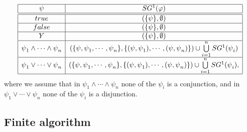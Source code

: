 \begin{equation*}
\begin{array}{|c|c|}
\hline
\psi  & SG^{1}(\varphi ) \\ \hline\hline
true & (\{\psi \},\emptyset ) \\ \hline
false & (\{\psi \},\emptyset ) \\ \hline
Y & (\{\psi \},\emptyset ) \\ \hline
\psi _{1}\wedge \cdots \wedge \psi _{n} & \left( \{\psi ,\psi _{1},\cdots
,\psi _{n}\},\{(\psi ,\psi _{1}),\cdots ,(\psi ,\psi _{n})\}\right) \cup
\bigcup\limits_{i=1}^{n}SG^{1}(\psi _{i}) \\ \hline
\psi _{1}\vee \cdots \vee \psi _{n} & \left( \{\psi ,\psi _{1},\cdots ,\psi
_{n}\},\{(\psi ,\psi _{1}),\cdots ,(\psi ,\psi _{n})\}\right) \cup
\bigcup\limits_{i=1}^{n}SG^{1}(\psi _{i}), \\ \hline
\end{array}%
\end{equation*}%
where we assume that in $\psi _{1}\wedge \cdots \wedge \psi _{n}$ none of
the $\psi _{i}$ is a conjunction, and in $\psi _{1}\vee \cdots \vee \psi _{n}
$ none of the $\psi _{i}$ is a disjunction.

\newpage

\subsection{Finite algorithm}

